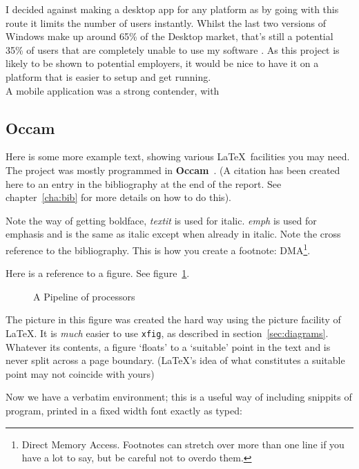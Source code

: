 I decided against making a desktop app for any platform as by going with this route it limits the number of users instantly. Whilst the last two versions of Windows make up around 65\% of the Desktop market, that's still a potential 35\% of users that are completely unable to use my software \cite{windows}. As this project is likely to be shown to potential employers, it would be nice to have it on a platform that is easier to setup and get running.\\

A mobile application was a strong contender, with 

\subsection{Occam}

Here is some more example text, showing various \LaTeX\ facilities
you may need.  The project was mostly programmed in
\textbf{Occam}~\cite{occam}.  (A citation has been created  here to an
entry in the bibliography at the end of the report. See
chapter~\ref{cha:bib} for more details on how to do this).

Note the way of getting boldface, \textit{textit} is used for italic.
\emph{emph} is used for emphasis and is the same as italic except when
already in italic.  Note the cross reference to the bibliography.
This is how you create a footnote: DMA\footnote{Direct Memory Access.
  Footnotes can stretch over more than one line if you have a lot to
  say, but be careful not to overdo them.}.

Here is a reference to a figure. See figure~\ref{pipeline}.
\begin{figure}[htbp]
  \centering
  
  \caption{A Pipeline of processors
    \label{pipeline}}           %
\end{figure}
The picture in this figure was created the hard way using the picture
facility of \LaTeX. It is \emph{much} easier to use \texttt{xfig}, as
described in section~\ref{sec:diagrams}.  Whatever its contents, a
figure `floats' to a `suitable' point in the text and is never split
across a page boundary. (\LaTeX's idea of what constitutes a suitable
point may not coincide with yours)


Now we have a verbatim environment; this is a useful way of including
snippits of program, printed in a fixed width font exactly as typed:

